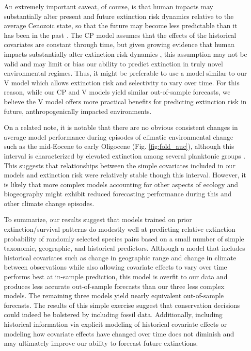 \documentclass[12pt,letterpaper]{article}
\begin{document}
\begin{refsection}
An extremely important caveat, of course, is that human impacts may substantially alter present and future extinction risk dynamics relative to the average Cenozoic state, so that the future may become less predictable than it has been in the past \citep{Harnik2012a,Finnegan2015}. The CP model assumes that the effects of the historical covariates are constant through time, but given growing evidence that human impacts substantially alter extinction risk dynamics \citep{Harnik2012a,Finnegan2015,Payne2007}, this assumption may not be valid and may limit or bias our ability to predict extinction in truly novel environmental regimes. Thus, it might be preferable to use a model similar to our V model which allows extinction risk and selectivity to vary over time. For this reason, while our CP and V models yield similar out-of-sample forecasts, we believe the V model offers more practical benefits for predicting extinction risk in future, anthropogenically impacted environments.

On a related note, it is notable that there are no obvious consistent changes in average model performance during episodes of climatic environmental change such as the mid-Eocene to early Oligocene (Fig. \ref{fig:fold_auc}), although this interval is characterized by elevated extinction among several planktonic groups \citep{Prothero1994,Wade2008,Kamikuri2012}. This suggests that relationships between the simple covariates included in our models and extinction risk were relatively stable though this interval.  However, it is likely that more complex models accounting for other aspects of ecology and biogeography might exhibit reduced forecasting performance during this and other climate change episodes.

To summarize, our results suggest that models trained on prior extinction/survival patterns do modestly well at predicting relative extinction probability of randomly selected species pairs based on a small number of simple taxonomic, geographic, and historical predictors. Although a model that includes historical covariates such as change in geographic range and change in climate between observations while also allowing covariate effects to vary over time performs best at in-sample prediction, this model is overfit to our data and produces less accurate out-of-sample forecasts than our three less complex models. The remaining three models yield nearly equivalent out-of-sample forecasts. The results of this simple exercise suggest that conservation decisions could indeed be bolstered by including fossil data. Additionally, including historical information via explicit modeling of historical covariate effects or modeling how covariate effects have changed over time does not diminish and may ultimately improve our ability to forecast future extinctions. 



\end{refsection}
\end{document}

